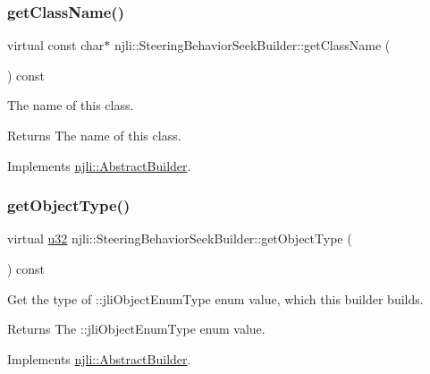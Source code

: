 \subsubsection{\texorpdfstring{get\+Class\+Name()}{getClassName()}}
{\footnotesize\ttfamily virtual const char$\ast$ njli\+::\+Steering\+Behavior\+Seek\+Builder\+::get\+Class\+Name (\begin{DoxyParamCaption}{ }\end{DoxyParamCaption}) const\hspace{0.3cm}{\ttfamily [virtual]}}

The name of this class.

\begin{DoxyReturn}{Returns}
The name of this class. 
\end{DoxyReturn}


Implements \mbox{\hyperlink{classnjli_1_1_abstract_builder_a902f73ea78031b06aca183a417f3413b}{njli\+::\+Abstract\+Builder}}.

\mbox{\label{classnjli_1_1_steering_behavior_seek_builder_a67b69c5df3080e047ef80b0730b2a354}} 
\subsubsection{\texorpdfstring{get\+Object\+Type()}{getObjectType()}}
{\footnotesize\ttfamily virtual \mbox{\hyperlink{_util_8h_a10e94b422ef0c20dcdec20d31a1f5049}{u32}} njli\+::\+Steering\+Behavior\+Seek\+Builder\+::get\+Object\+Type (\begin{DoxyParamCaption}{ }\end{DoxyParamCaption}) const\hspace{0.3cm}{\ttfamily [virtual]}}

Get the type of \+::jli\+Object\+Enum\+Type enum value, which this builder builds.

\begin{DoxyReturn}{Returns}
The \+::jli\+Object\+Enum\+Type enum value. 
\end{DoxyReturn}


Implements \mbox{\hyperlink{classnjli_1_1_abstract_builder_a0f2d344fcf697b167f4f2b1122b5fb33}{njli\+::\+Abstract\+Builder}}.

